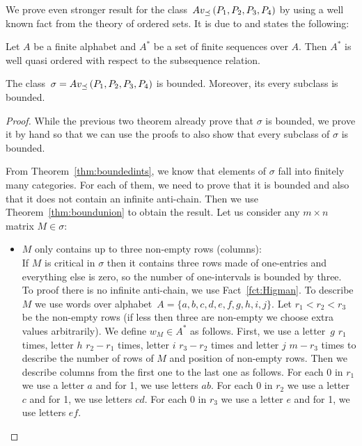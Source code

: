 We prove even stronger result for the class~$Av_{\preceq}\left(P_1,P_2,P_3,P_4\right)$ by using a well known fact from the theory of ordered sets. It is due to \cite{higman} and states the following:

\begin{fct}
\label{fct:Higman}
Let $A$ be a finite alphabet and $A^*$ be a set of finite sequences over $A$. Then $A^*$ is well quasi ordered with respect to the subsequence relation.
\end{fct}

\begin{thm}
The class~$\sigma=Av_{\preceq}\left(P_1,P_2,P_3,P_4\right)$ is bounded. Moreover, its every subclass is bounded.
\end{thm}
\begin{proof}
While the previous two theorem already prove that $\sigma$ is bounded, we prove it by hand so that we can use the proofs to also show that every subclass of $\sigma$ is bounded.

From Theorem~\ref{thm:boundedints}, we know that elements of $\sigma$ fall into finitely many categories. For each of them, we need to prove that it is bounded and also that it does not contain an infinite anti-chain. Then we use Theorem~\ref{thm:boundunion} to obtain the result. Let us consider any $m\times n$ matrix $M\in\sigma$:
\begin{itemize}
	\item $M$ only contains up to three non-empty rows (columns):\\
		If $M$ is critical in $\sigma$ then it contains three rows made of one-entries and everything else is zero, so the number of one-intervals is bounded by three.\\
		
		To proof there is no infinite anti-chain, we use Fact~\ref{fct:Higman}. To describe $M$ we use words over alphabet~$A=\{a,b,c,d,e,f,g,h,i,j\}$. Let $r_1<r_2<r_3$ be the non-empty rows (if less then three are non-empty we choose extra values arbitrarily). We define $w_M\in A^*$ as follows. First, we use a letter~$g$ $r_1$ times, letter $h$ $r_2-r_1$ times, letter $i$ $r_3-r_2$ times and letter $j$ $m-r_3$ times to describe the number of rows of $M$ and position of non-empty rows. Then we describe columns from the first one to the last one as follows. For each 0 in $r_1$ we use a letter $a$ and for 1, we use letters $ab$. For each 0 in $r_2$ we use a letter $c$ and for 1, we use letters $cd$. For each 0 in $r_3$ we use a letter $e$ and for 1, we use letters $ef$.
		

\end{itemize}
\end{proof}
